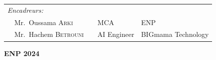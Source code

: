 {\begin{titlepage}
\begin{flushleft}
\begin{tabular}{llcll}
            \\
            \textit{Encadreurs:}                                   &  &             &                    \\
            \multicolumn{2}{l}{~~Mr.\ Oussama \textsc{Arki}}       &  & MCA         & ENP                \\
            \multicolumn{2}{l}{~~Mr.\ Hachem \textsc{Betrouni}}    &  & AI Engineer & BIGmama Technology \\
        \end{tabular}
    \end{flushleft}

    \vspace*{8mm}
    \begin{center}
        \textbf{ENP 2024}
    \end{center}

\end{titlepage}
}